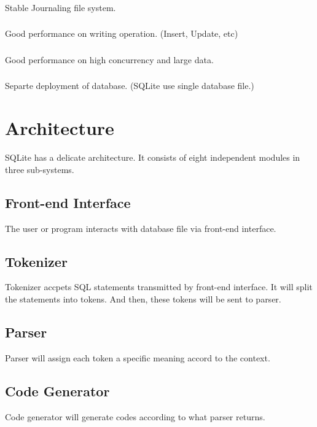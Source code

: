 \documentclass[journal]{IEEEtran}
\begin{document}
\subsubsection{}
Stable Journaling file system.

\subsubsection{}
Good performance on writing operation. (Insert, Update, etc)

\subsubsection{}
Good performance on high concurrency and large data.

\subsubsection{}
Separte deployment of database. (SQLite use single database file.)


\section{Architecture}
SQLite has a delicate architecture. It consists of eight independent modules in three sub-systems.
\subsection{Front-end Interface}
The user or program interacts with database file via front-end interface.

\subsection{Tokenizer}
Tokenizer accpets SQL statements transmitted by front-end interface. It will split the statements into tokens. And then, these tokens will be sent to parser.

\subsection{Parser}
Parser will assign each token a specific meaning accord to the context.

\subsection{Code Generator}
Code generator will generate codes according to what parser returns.
\end{document}
